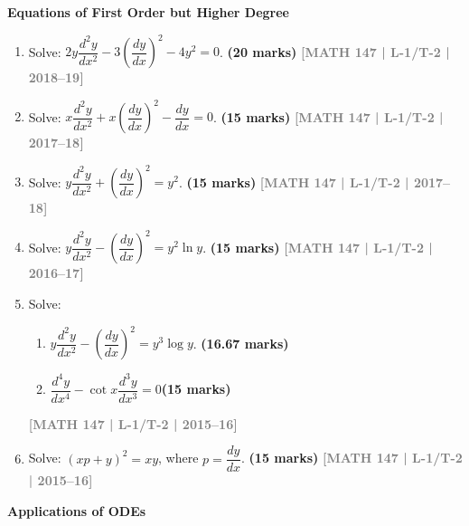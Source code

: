 \documentclass[12pt,a4paper]{article}
\newcommand{\yr}[1]{\hfill\textcolor{gray}{\small\textbf{[#1]}}}
\newcommand{\mk}[1]{\textcolor{orange!70!black}{\small\textbf{(#1 marks)}}}
\newcommand{\subtopic}[2]{%
  \vspace{10pt}
  \noindent\begin{tcolorbox}[colback=#1!8,colframe=#1,boxrule=0.6pt,arc=4pt,
    left=6pt,right=6pt,top=4pt,bottom=4pt]
    \small\bfseries\textcolor{#1}{#2}
  \end{tcolorbox}
  \vspace{2pt}
}
\begin{document}
\subtopic{cC}{Equations of First Order but Higher Degree}
\label{sub:s3-higherdeg}

\begin{enumerate}\item Solve: $2y\dfrac{d^{2}y}{dx^{2}}-3\left(\dfrac{dy}{dx}\right)^{2}-4y^{2}=0$.
\mk{20} \yr{MATH 147 | L-1/T-2 | 2018--19}

\item Solve: $x\dfrac{d^{2}y}{dx^{2}}+x\left(\dfrac{dy}{dx}\right)^{2}-\dfrac{dy}{dx}=0$.
\mk{15} \yr{MATH 147 | L-1/T-2 | 2017--18}

\item Solve: $y\dfrac{d^{2}y}{dx^{2}}+\left(\dfrac{dy}{dx}\right)^{2}=y^{2}$.
\mk{15} \yr{MATH 147 | L-1/T-2 | 2017--18}

\item Solve: $y\dfrac{d^{2}y}{dx^{2}}-\left(\dfrac{dy}{dx}\right)^{2}=y^{2}\ln y$.
\mk{15} \yr{MATH 147 | L-1/T-2 | 2016--17}

\item Solve:
\begin{enumerate}
\item $y\dfrac{d^{2}y}{dx^{2}}-\left(\dfrac{dy}{dx}\right)^{2}=y^{3}\log y$. \mk{16.67}
\item $\dfrac{d^{4}y}{dx^{4}}-\cot{x}\dfrac{d^{3}y}{dx^{3}}=0$\mk{15} 
\end{enumerate}  
\yr{MATH 147 | L-1/T-2 | 2015--16}
\item Solve: $(xp+y)^{2}=xy$, where $p=\dfrac{dy}{dx}$.
\mk{15} \yr{MATH 147 | L-1/T-2 | 2015--16}

\end{enumerate}


\subtopic{cC}{Applications of ODEs}
\label{sub:s3-applications}
\end{document}
